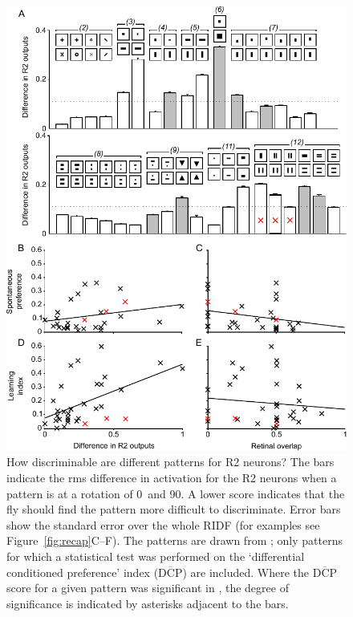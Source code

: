 \begin{figure}
\centering
\includegraphics{figures/pattern}
\caption{How discriminable are different patterns for R2 neurons?
The bars indicate the \ac{rms} difference in activation for the R2 neurons when a pattern is at a rotation of 0\degree\ and 90\degree.
A lower score indicates that the fly should find the pattern more difficult to discriminate.
Error bars show the standard error over the whole \ac{RIDF} (for examples see Figure~\ref{fig:recap}C--F).
The patterns are drawn from \protect\cite{Ernst1999}; only patterns for which a statistical test was performed on the `differential conditioned preference' index ($\overline{\mathrm{DCP}}$) are included.
Where the $\overline{\mathrm{DCP}}$ score for a given pattern was significant in \protect\cite{Ernst1999}, the degree of significance is indicated by asterisks adjacent to the bars.
}
\label{fig:pattern}
\end{figure}
